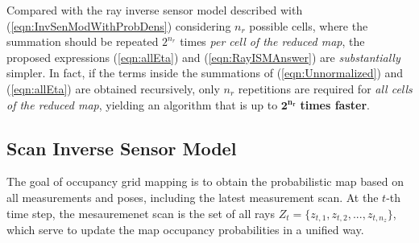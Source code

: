 \documentclass[letterpaper, 10pt, conference]{ieeeconf}
\newcommand{\refeqn}[1]{(\ref{eqn:#1})}
\begin{document}
Compared with the ray inverse sensor model described with \refeqn{InvSenModWithProbDens} considering $n_r$ possible cells, where the summation should be repeated $2^{n_r}$ times \emph{per cell of the reduced map}, the proposed expressions  \refeqn{allEta} and \refeqn{RayISMAnswer} are \textit{substantially} simpler.
In fact, if the terms inside the summations of \refeqn{Unnormalized} and \refeqn{allEta} are obtained recursively, only $n_r$ repetitions are required for \emph{all cells of the reduced map}, yielding an algorithm that is up to $\mathbf{2^{n_r}}$ \textbf{times faster}.

\subsection{Scan Inverse Sensor Model}

The goal of occupancy grid mapping is to obtain the probabilistic map based on all measurements and poses, including the latest measurement scan.
At the $t$-th time step, the mesauremenet scan is the set of all rays $Z_t=\{z_{t,1},z_{t,2},...,z_{t,n_z}\}$, which serve to update the map occupancy probabilities in a unified way.
\end{document}
